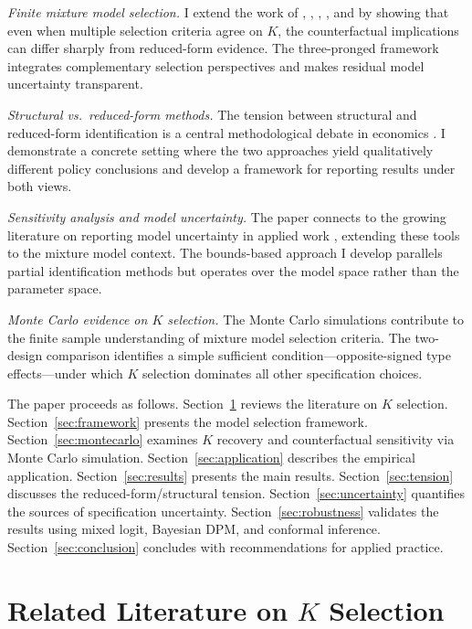 \documentclass[12pt]{article}
\begin{document}
\textit{Finite mixture model selection.} I extend the work of \citet{kasahara2009}, \citet{compiani2016}, \citet{hao2025}, \citet{budanova2025}, and \citet{bonhomme2022} by showing that even when multiple selection criteria agree on $K$, the counterfactual implications can differ sharply from reduced-form evidence. The three-pronged framework integrates complementary selection perspectives and makes residual model uncertainty transparent.

\textit{Structural vs.\ reduced-form methods.} The tension between structural and reduced-form identification is a central methodological debate in economics \citep{heckman2010, angrist2010, keane2010, nevo2010}. I demonstrate a concrete setting where the two approaches yield qualitatively different policy conclusions and develop a framework for reporting results under both views.

\textit{Sensitivity analysis and model uncertainty.} The paper connects to the growing literature on reporting model uncertainty in applied work \citep{leamer1983, oster2019, cinelli2020, andrews2023}, extending these tools to the mixture model context. The bounds-based approach I develop parallels partial identification methods \citep{manski2003} but operates over the model space rather than the parameter space.

\textit{Monte Carlo evidence on $K$ selection.} The Monte Carlo simulations contribute to the finite sample understanding of mixture model selection criteria. The two-design comparison identifies a simple sufficient condition---opposite-signed type effects---under which $K$ selection dominates all other specification choices.

The paper proceeds as follows. Section~\ref{sec:lit} reviews the literature on $K$ selection. Section~\ref{sec:framework} presents the model selection framework. Section~\ref{sec:montecarlo} examines $K$ recovery and counterfactual sensitivity via Monte Carlo simulation. Section~\ref{sec:application} describes the empirical application. Section~\ref{sec:results} presents the main results. Section~\ref{sec:tension} discusses the reduced-form/structural tension. Section~\ref{sec:uncertainty} quantifies the sources of specification uncertainty. Section~\ref{sec:robustness} validates the results using mixed logit, Bayesian DPM, and conformal inference. Section~\ref{sec:conclusion} concludes with recommendations for applied practice.


\section{Related Literature on $K$ Selection}
\label{sec:lit}
\end{document}
